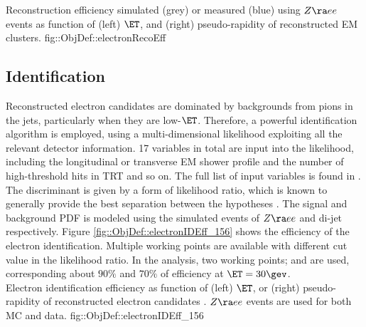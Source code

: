 { Reconstruction efficiency simulated (grey) or measured (blue) using $Z\ra ee$ events \cite{156_ElectronEffMeas_2015data} as function of (left) $\ET$, and (right) pseudo-rapidity of reconstructed EM clusters.}
{fig::ObjDef::electronRecoEff}


\clearpage
\subsection{Identification} \label{sec::objDef::electrons::id}
Reconstructed electron candidates are dominated by backgrounds from pions in the jets, particularly when they are low-$\ET$. Therefore, a powerful identification algorithm is employed, using a multi-dimensional likelihood exploiting all the relevant detector information. 17 variables in total are input into the likelihood, including the longitudinal or transverse EM shower profile and the number of high-threshold hits in TRT and so on. The full list of input variables is found in \cite{156_ElectronEffMeas_2015data}.
The discriminant is given by a form of likelihood ratio, which is known to generally provide the best separation between the hypotheses \cite{NPLemma}.
The signal and background PDF is modeled using the simulated events of $Z\ra ee$ and di-jet respectively.
Figure \ref{fig::ObjDef::electronIDEff_156} shows the efficiency of the electron identification.
Multiple working points are available with different cut value in the likelihood ratio. 
In the analysis, two working points;  and  are used, corresponding about $90\%$ and $70\%$ of efficiency at $\ET = 30\gev$. \\


{Electron identification efficiency as function of (left) $\ET$, or (right) pseudo-rapidity of reconstructed electron candidates \cite{156_ElectronEffMeas_2015data}. $Z\ra ee$ events are used for both MC and data.}
{fig::ObjDef::electronIDEff_156}





